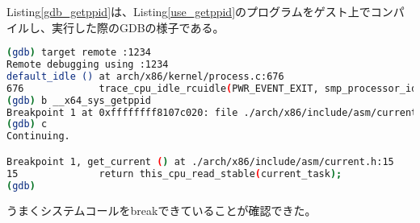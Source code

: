 \documentclass[main]{subfiles}
\begin{document}
Listing\ref{gdb_getppid}は、Listing\ref{use_getppid}のプログラムをゲスト上でコンパイルし、実行した際のGDBの様子である。

\begin{lstlisting}[label=gdb_getppid,caption=GDBの動作の様子,language=sh]
(gdb) target remote :1234
Remote debugging using :1234
default_idle () at arch/x86/kernel/process.c:676
676             trace_cpu_idle_rcuidle(PWR_EVENT_EXIT, smp_processor_id());
(gdb) b __x64_sys_getppid
Breakpoint 1 at 0xffffffff8107c020: file ./arch/x86/include/asm/current.h, line 15.
(gdb) c
Continuing.

Breakpoint 1, get_current () at ./arch/x86/include/asm/current.h:15
15              return this_cpu_read_stable(current_task);
(gdb)
\end{lstlisting}

うまくシステムコールをbreakできていることが確認できた。
\end{document}
